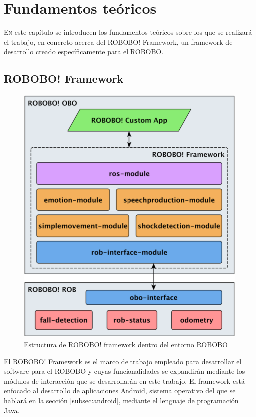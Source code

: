 \chapter{Fundamentos teóricos}
\label{chap:fundamentos-teoricos}
\vspace{0.5cm}



\lettrine{E}{n} este capítulo se introducen los fundamentos teóricos sobre los que se realizará el trabajo, en concreto acerca del ROBOBO! Framework, un framework de desarrollo creado específicamente para el ROBOBO.



\section{ROBOBO! Framework}
\label{sec:robobo-framework}

\begin{figure}
	\centering
	\includegraphics[width=0.6\linewidth]{imagenes/robobo_framework.png}
	\caption{Estructura de ROBOBO! framework dentro del entorno ROBOBO}
	\label{fig:robobo_framework_estructure}
\end{figure}
El ROBOBO! Framework es el marco de trabajo empleado para desarrollar el software para el ROBOBO y cuyas funcionalidades se expandirán mediante los módulos de interacción que se desarrollarán en este trabajo. 
El framework está enfocado al desarrollo de aplicaciones Android, sistema operativo del que se hablará en la sección \ref{subsec:android}, mediante el lenguaje de programación Java.
 
